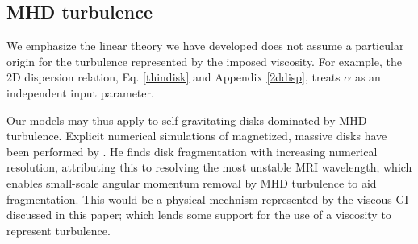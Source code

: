 
\subsection{MHD turbulence}\label{MHD}%
We emphasize the linear theory we have developed does not assume  
a particular origin for the turbulence represented by the imposed
viscosity. For example, the 2D dispersion relation, Eq. \ref{thindisk}
and Appendix \ref{2ddisp}, treats $\alpha$ as an independent
input parameter. 


Our models may thus apply to self-gravitating disks dominated by MHD
turbulence.     
Explicit numerical simulations of magnetized, massive disks have been performed 
by \cite{fromang05}. He finds disk fragmentation with increasing numerical
resolution, attributing this to resolving the most unstable MRI
wavelength, which enables small-scale angular momentum removal by MHD
turbulence to aid fragmentation. %
This would be a physical mechnism represented by the viscous GI
discussed in this paper; which lends some support for  
the use of a viscosity to represent turbulence.    



